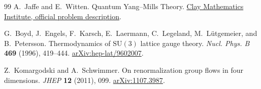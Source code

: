 \documentclass[11pt,a4paper]{article}
\numberwithin{equation}{section}
\begin{document}
\begin{thebibliography}{99}
A.~Jaffe and E.~Witten.
Quantum Yang--Mills Theory.
\href{https://www.claymath.org/wp-content/uploads/2022/06/yangmills.pdf}{Clay Mathematics Institute, official problem description}.

G.~Boyd, J.~Engels, F.~Karsch, E.~Laermann, C.~Legeland, M.~L\"utgemeier, and B.~Petersson.
Thermodynamics of \(\mathrm{SU}(3)\) lattice gauge theory.
\emph{Nucl. Phys. B} \textbf{469} (1996), 419--444.
\href{https://arxiv.org/abs/hep-lat/9602007}{arXiv:hep-lat/9602007}.

Z.~Komargodski and A.~Schwimmer.
On renormalization group flows in four dimensions.
\emph{JHEP} \textbf{12} (2011), 099.
\href{https://arxiv.org/abs/1107.3987}{arXiv:1107.3987}.

\end{thebibliography}
\endgroup
\end{document}
